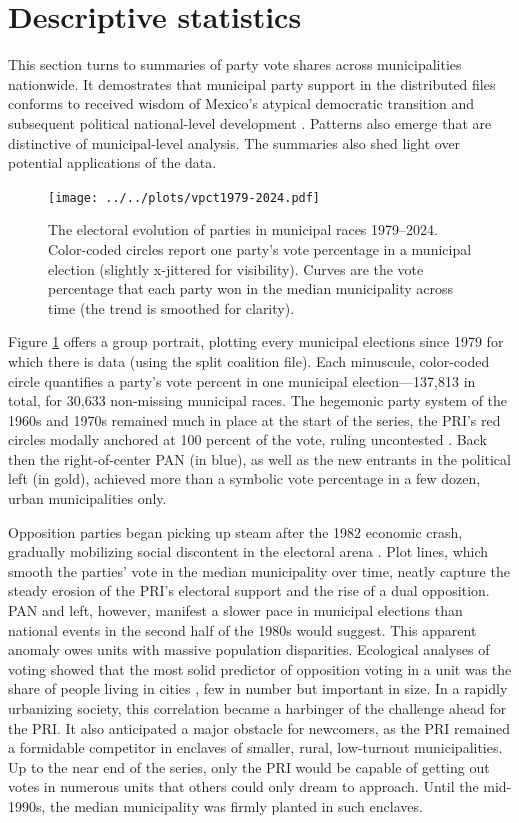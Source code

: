 \documentclass[letter,12pt]{article}
\begin{document}
\section{Descriptive statistics}

This section turns to summaries of party vote shares across municipalities nationwide. It demostrates that municipal party support in the distributed files conforms to received wisdom of Mexico's atypical democratic transition \citep[eg.][]{cornelius.1996} and subsequent political national-level development \citep[eg.][]{diaz-estevez-magaloni-Poverty-book.2016}. Patterns also emerge that are distinctive of municipal-level analysis. The summaries also shed light over potential applications of the data.

\begin{figure}
  \texttt{[image: ../../plots/vpct1979-2024.pdf]}
  \caption{The electoral evolution of parties in municipal races 1979--2024. Color-coded circles report one party's vote percentage in a municipal election (slightly x-jittered for visibility). Curves are the vote percentage that each party won in the median municipality across time (the trend is smoothed for clarity).}\label{F:vpcts}
\end{figure}  

Figure \ref{F:vpcts} offers a group portrait, plotting every municipal elections since 1979 for which there is data (using the split coalition file). Each minuscule, color-coded circle quantifies a party's vote percent in one municipal election---137,813 in total, for 30,633 non-missing municipal races. The hegemonic party system of the 1960s and 1970s remained much in place at the start of the series, the PRI's red circles modally anchored at 100 percent of the vote, ruling uncontested \citep{segovia.els1979}. Back then the right-of-center PAN (in blue), as well as the new entrants in the political left (in gold), achieved more than a symbolic vote percentage in a few dozen, urban municipalities only.

Opposition parties began picking up steam after the 1982 economic crash, gradually mobilizing social discontent in the electoral arena \citep{molinar.1991a,klesner.Alignment.1993}. Plot lines, which smooth the parties' vote in the median municipality over time, neatly capture the steady erosion of the PRI's electoral support and the rise of a dual opposition. PAN and left, however, manifest a slower pace in municipal elections than national events in the second half of the 1980s would suggest. This apparent anomaly owes units with massive population disparities. Ecological analyses of voting showed that the most solid predictor of opposition voting in a unit was the share of people living in cities \citep{ames.1970,lehr.1985,magar.1994}, few in number but important in size. In a rapidly urbanizing society, this correlation became a harbinger of the challenge ahead for the PRI. It also anticipated a major obstacle for newcomers, as the PRI remained a formidable competitor in enclaves of smaller, rural, low-turnout municipalities. Up to the near end of the series, only the PRI would be capable of getting out votes in numerous units that others could only dream to approach. Until the mid-1990s, the median municipality was firmly planted in such enclaves.
\end{document}
